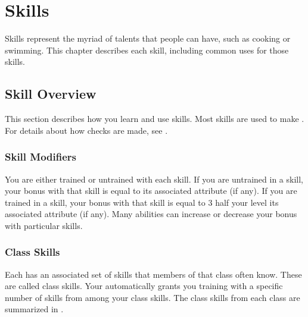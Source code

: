 \chapter{Skills}\label{Skills}

Skills represent the myriad of talents that people can have, such as cooking or swimming.
This chapter describes each skill, including common uses for those skills.

\section{Skill Overview}
  This section describes how you learn and use skills.
  Most skills are used to make .
  For details about how checks are made, see .

  \subsection{Skill Modifiers}
    You are either trained or untrained with each skill.
    If you are untrained in a skill, your bonus with that skill is equal to its associated attribute (if any).
    If you are trained in a skill, your bonus with that skill is equal to 3 \add half your level \add its associated attribute (if any).
    Many abilities can increase or decrease your bonus with particular skills.

  \subsection{Class Skills}\label{Class Skills}
    Each  has an associated set of skills that members of that class often know.
    These are called class skills.
    Your  automatically grants you training with a specific number of skills from among your class skills.
    The class skills from each class are summarized in .

